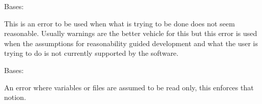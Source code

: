 \documentclass[letterpaper,11pt,english]{sphinxmanual}
\begin{document}
\begin{savenotes}\begin{fulllineitems}
\label{\detokenize{code/opihiexarata.library.error:opihiexarata.library.error.PracticalityError}}
\pysigstartsignatures
{}
\pysigstopsignatures
\sphinxAtStartPar
Bases: {\hyperref[\detokenize{code/opihiexarata.library.error:opihiexarata.library.error.ExarataBaseException}]{}}

\sphinxAtStartPar
This is an error to be used when what is trying to be done does not
seem reasonable. Usually warnings are the better vehicle for this but
this error is used when the assumptions for reasonability guided
development and what the user is trying to do is not currently supported
by the software.

\end{fulllineitems}\end{savenotes}


\begin{savenotes}\begin{fulllineitems}
\label{\detokenize{code/opihiexarata.library.error:opihiexarata.library.error.ReadOnlyError}}
\pysigstartsignatures
{}
\pysigstopsignatures
\sphinxAtStartPar
Bases: {\hyperref[\detokenize{code/opihiexarata.library.error:opihiexarata.library.error.ExarataException}]{}}

\sphinxAtStartPar
An error where variables or files are assumed to be read only, this
enforces that notion.

\end{fulllineitems}\end{savenotes}
\end{document}
